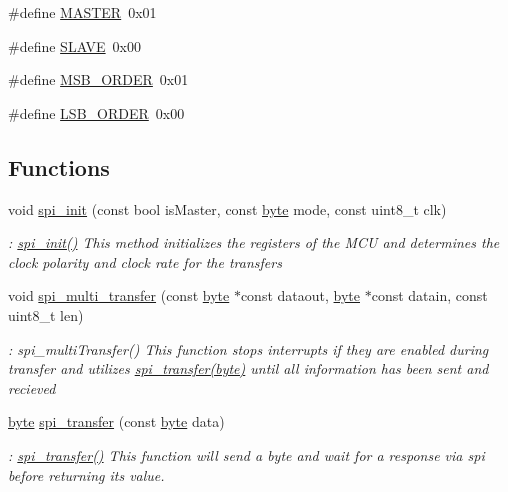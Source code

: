 \begin{DoxyCompactItemize}
\item 
\#define \hyperlink{a00015_a3fa2d3bf1901157f734a584d47b25d8b}{M\-A\-S\-T\-E\-R}~0x01
\item 
\#define \hyperlink{a00015_ae342da5a4630c191c1c983958808edd8}{S\-L\-A\-V\-E}~0x00
\item 
\#define \hyperlink{a00015_a8ff732a711fc73375510b83b52b89835}{M\-S\-B\-\_\-\-O\-R\-D\-E\-R}~0x01
\item 
\#define \hyperlink{a00015_a0336046ec21c47729c579b51957b2644}{L\-S\-B\-\_\-\-O\-R\-D\-E\-R}~0x00
\end{DoxyCompactItemize}
\subsection*{Functions}
\begin{DoxyCompactItemize}
\item 
void \hyperlink{a00015_a94087004a94105cf6d70f8ea90af2408}{spi\-\_\-init} (const bool is\-Master, const \hyperlink{a00011_a82b52bf2b45e214a8f2100ebfdf1aee4}{byte} mode, const uint8\-\_\-t clk)
\begin{DoxyCompactList}\small\item\em \-: \hyperlink{a00015_a94087004a94105cf6d70f8ea90af2408}{spi\-\_\-init()} This method initializes the registers of the M\-C\-U and determines the clock polarity and clock rate for the transfers \end{DoxyCompactList}\item 
void \hyperlink{a00015_a106510ceb36305d7442f75e830fb98c2}{spi\-\_\-multi\-\_\-transfer} (const \hyperlink{a00011_a82b52bf2b45e214a8f2100ebfdf1aee4}{byte} $\ast$const dataout, \hyperlink{a00011_a82b52bf2b45e214a8f2100ebfdf1aee4}{byte} $\ast$const datain, const uint8\-\_\-t len)
\begin{DoxyCompactList}\small\item\em \-: spi\-\_\-multi\-Transfer() This function stops interrupts if they are enabled during transfer and utilizes \hyperlink{a00015_aab1ad15333780e6b9f8c8be602682818}{spi\-\_\-transfer(byte)} until all information has been sent and recieved \end{DoxyCompactList}\item 
\hyperlink{a00011_a82b52bf2b45e214a8f2100ebfdf1aee4}{byte} \hyperlink{a00015_aab1ad15333780e6b9f8c8be602682818}{spi\-\_\-transfer} (const \hyperlink{a00011_a82b52bf2b45e214a8f2100ebfdf1aee4}{byte} data)
\begin{DoxyCompactList}\small\item\em \-: \hyperlink{a00015_aab1ad15333780e6b9f8c8be602682818}{spi\-\_\-transfer()} This function will send a byte and wait for a response via spi before returning its value. \end{DoxyCompactList}\item 

\end{DoxyCompactItemize}
